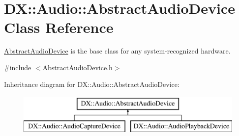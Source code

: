 \hypertarget{class_d_x_1_1_audio_1_1_abstract_audio_device}{\section{D\-X\-:\-:Audio\-:\-:Abstract\-Audio\-Device Class Reference}
\label{class_d_x_1_1_audio_1_1_abstract_audio_device}
}


\hyperlink{class_d_x_1_1_audio_1_1_abstract_audio_device}{Abstract\-Audio\-Device} is the base class for any system-\/recognized hardware.  




{\ttfamily \#include $<$Abstract\-Audio\-Device.\-h$>$}

Inheritance diagram for D\-X\-:\-:Audio\-:\-:Abstract\-Audio\-Device\-:\begin{figure}[H]
\begin{center}
\leavevmode
\includegraphics[height=2.000000cm]{class_d_x_1_1_audio_1_1_abstract_audio_device}
\end{center}
\end{figure}
